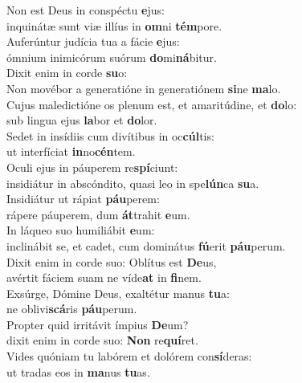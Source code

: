 \evenverse Non est Deus in conspéctu \textbf{e}jus:~\*\\
\evenverse inquinátæ sunt viæ illíus in \textbf{om}ni \textbf{tém}pore.\\
\oddverse Auferúntur judícia tua a fácie \textbf{e}jus:~\*\\
\oddverse ómnium inimicórum suórum \textbf{do}mi\textbf{ná}bitur.\\
\evenverse Dixit enim in corde \textbf{su}o:~\*\\
\evenverse Non movébor a generatióne in generatiónem \textbf{si}ne \textbf{ma}lo.\\
\oddverse Cujus maledictióne os plenum est, et amaritúdine, et \textbf{do}lo:~\*\\
\oddverse sub lingua ejus \textbf{la}bor et \textbf{do}lor.\\
\evenverse Sedet in insídiis cum divítibus in oc\textbf{cúl}tis:~\*\\
\evenverse ut interfíciat \textbf{in}no\textbf{cén}tem.\\
\oddverse Oculi ejus in páuperem re\textbf{spí}ciunt:~\*\\
\oddverse insidiátur in abscóndito, quasi leo in spe\textbf{lún}ca \textbf{su}a.\\
\evenverse Insidiátur ut rápiat \textbf{páu}perem:~\*\\
\evenverse rápere páuperem, dum \textbf{át}trahit \textbf{e}um.\\
\oddverse In láqueo suo humiliábit \textbf{e}um:~\*\\
\oddverse inclinábit se, et cadet, cum dominátus \textbf{fú}erit \textbf{páu}perum.\\
\evenverse Dixit enim in corde suo: Oblítus est \textbf{De}us,~\*\\
\evenverse avértit fáciem suam ne víde\textbf{at} in \textbf{fi}nem.\\
\oddverse Exsúrge, Dómine Deus, exaltétur manus \textbf{tu}a:~\*\\
\oddverse ne oblivi\textbf{scá}ris \textbf{páu}perum.\\
\evenverse Propter quid irritávit ímpius \textbf{De}um?~\*\\
\evenverse dixit enim in corde suo: \textbf{Non} re\textbf{quí}ret.\\
\oddverse Vides quóniam tu labórem et dolórem con\textbf{sí}deras:~\*\\
\oddverse ut tradas eos in \textbf{ma}nus \textbf{tu}as.\\
